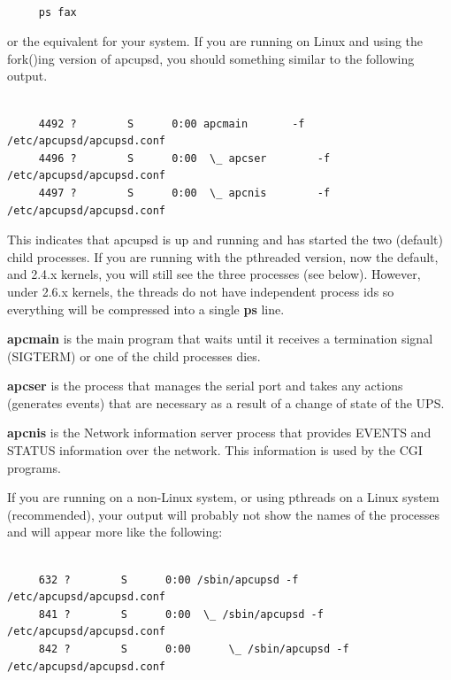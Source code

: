 {\footnotesize
\begin{verbatim}
     
     ps fax
\end{verbatim}
\normalsize

or the equivalent for your system. If you are running on Linux and using the
fork()ing version of apcupsd, you should something similar to the following
output. 

\footnotesize
\begin{verbatim}
     
     4492 ?        S      0:00 apcmain       -f /etc/apcupsd/apcupsd.conf
     4496 ?        S      0:00  \_ apcser        -f /etc/apcupsd/apcupsd.conf
     4497 ?        S      0:00  \_ apcnis        -f /etc/apcupsd/apcupsd.conf
\end{verbatim}
\normalsize

This indicates that apcupsd is up and running and has started the two
(default) child processes. If you are running with the pthreaded version, now
the default, and 2.4.x kernels, you will still see the three processes (see
below).  However, under 2.6.x kernels, the threads do not have independent
process ids so everything will be compressed into a single {\bf ps} line.  

\begin{description}

\item {\bf apcmain}
is the main program that waits until it receives a termination signal
(SIGTERM) or one of the child processes dies.  

\item {\bf apcser}
is the process that manages the serial port and takes any actions (generates
events) that are necessary as a result of a change of state of the UPS.  

\item {\bf apcnis}
is the Network information server process that provides EVENTS and STATUS
information over the network. This information is used by the CGI programs. 
\end{description}

If you are running on a non-Linux system, or using pthreads on a Linux system
(recommended), your output will probably not show the names of the processes
and will appear more like the following: 

\footnotesize
\begin{verbatim}
     
     632 ?        S      0:00 /sbin/apcupsd -f /etc/apcupsd/apcupsd.conf
     841 ?        S      0:00  \_ /sbin/apcupsd -f /etc/apcupsd/apcupsd.conf
     842 ?        S      0:00      \_ /sbin/apcupsd -f /etc/apcupsd/apcupsd.conf
\end{verbatim}
\normalsize

}
